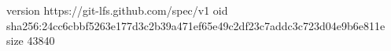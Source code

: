 version https://git-lfs.github.com/spec/v1
oid sha256:24cc6cbbf5263e177d3c2b39a471ef65e49c2df23c7addc3c723d04e9b6e811e
size 43840
